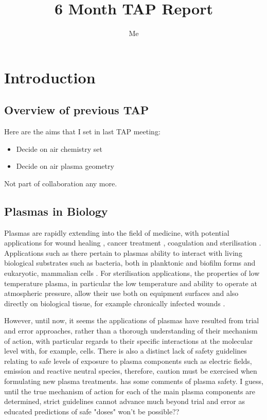 \documentclass[11pt, oneside]{article}   	%
\title{6 Month TAP Report}
\author{Me}
\begin{document}
\maketitle
\section{Introduction}
\subsection{Overview of previous TAP}
Here are the aims that I set in last TAP meeting:
\begin{itemize}
\item Decide on air chemistry set
\item Decide on air plasma geometry
\end{itemize}

Not part of collaboration any more.

\subsection{Plasmas in Biology}
Plasmas are rapidly extending into the field of medicine, with potential applications for wound healing \cite{Haertel2014nonthermal, Isbary2013nonthermal}, cancer treatment \cite{Hirst2016low, Fridman2007floating}, coagulation \cite{Fridman2006blood, Chen2009blood} and sterilisation \cite{Fridman2006blood, Laroussi2002nonthermal}.
Applications such as there pertain to plasmas ability to interact with living biological substrates such as bacteria, both in planktonic and biofilm forms \cite{Joshi2010control, Pei2012inactivation, Ziuzina2015cold} and eukaryotic, mammalian cells \cite{Haertel2014nonthermal}.
For sterilisation applications, the properties of low temperature plasma, in particular the low temperature and ability to operate at atmospheric pressure, allow their use both on equipment surfaces \cite{Laroussi2002nonthermal} and also directly on biological tissue, for example chronically infected wounds \cite{Haertel2014nonthermal, Isbary2013nonthermal, Fridman2006blood}.

However, until now, it seems the applications of plasmas have resulted from trial and error approaches, rather than a thorough understanding of their mechanism of action, with particular regards to their specific interactions at the molecular level with, for example, cells.
There is also a distinct lack of safety guidelines relating to safe levels of exposure to plasma components such as electric fields, emission and reactive neutral species, therefore, caution must be exercised when formulating new plasma treatments. 
\cite{Isbary2013cold} has some comments of plasma safety.
I guess, until the true mechanism of action for each of the main plasma components are determined, strict guidelines cannot advance much beyond trial and error as educated predictions of safe "doses" won't be possible??
\end{document}

